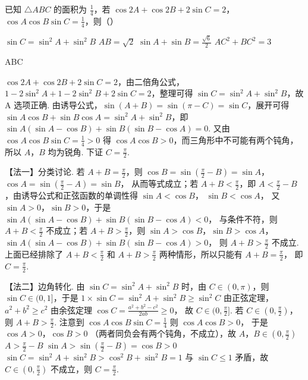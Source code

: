 \documentclass[UTF8,a4paper,oneside,11pt]{ctexbook}
\begin{document}
\begin{problem}
已知 \(\triangle ABC\) 的面积为 \(\frac{1}{4}\)，若 \(\cos 2A + \cos 2B + 2\sin C = 2\)，\(\cos A \cos B \sin C = \frac{1}{4}\)，则（\quad）

\choices
    {\(\sin C = \sin^2 A + \sin^2 B\)}
    {\(AB = \sqrt{2}\)}
    {\(\sin A + \sin B = \frac{\sqrt{6}}{2}\)}
    {\(AC^2 + BC^2 = 3\)}
\end{problem}

\begin{answer}
ABC
\end{answer}

\begin{solution}
\(\cos 2A + \cos 2B + 2\sin C = 2\)，由二倍角公式，\(1 - 2\sin^2 A + 1 - 2\sin^2 B + 2\sin C = 2\)，整理可得 \(\sin C = \sin^2 A + \sin^2 B\)，故 A 选项正确. 由诱导公式，\(\sin (A + B) = \sin (\pi - C) = \sin C\)，展开可得 \(\sin A \cos B + \sin B \cos A = \sin^2 A + \sin^2 B\)，即 \(\sin A (\sin A - \cos B) + \sin B (\sin B - \cos A) = 0\). 又由 \(\cos A\cos B\sin C=\frac{1}{4}>0\) 得 \(\cos A\cos B>0\)，而三角形中不可能有两个钝角，所以 \(A\)，\(B\) 均为锐角. 下证 \(C = \frac{\pi}{2}\).

【法一】分类讨论. 若 \(A + B = \frac{\pi}{2}\)，则
\(\cos B=\sin\left(\frac{\pi}{2}-B\right)=\sin A\)，\(\cos A=\sin\left(\frac{\pi}{2}-A\right)=\sin B\)，
从而等式成立；若 \(A + B < \frac{\pi}{2}\)，即 \(A < \frac{\pi}{2} - B\)，由诱导公式和正弦函数的单调性得
\(\sin A < \cos B\)，
\(\sin B < \cos A\)，
又 \(\sin A > 0\)，\(\sin B > 0\)，于是
\(\sin A (\sin A - \cos B) + \sin B (\sin B - \cos A) < 0\)，
与条件不符，则 \(A + B < \frac{\pi}{2}\) 不成立；若 \(A + B > \frac{\pi}{2}\)，则
\(\sin A > \cos B\)，\(\sin B > \cos A\)，
\(\sin A (\sin A - \cos B) + \sin B (\sin B - \cos A) > 0\)，
则 \(A + B > \frac{\pi}{2}\) 不成立.
上面已经排除了 \(A+B<\frac{\pi}{2}\) 和 \(A+B>\frac{\pi}{2}\) 两种情形，所以只能有
\(A + B = \frac{\pi}{2}\)，
即 \(C = \frac{\pi}{2}\).

【法二】边角转化. 由 \(\sin C = \sin^2 A + \sin^2 B\) 时，由 \(C \in (0,\pi)\)，则 \(\sin C \in (0,1]\)，于是
\(1 \times \sin C = \sin^2 A + \sin^2 B \ge \sin^2 C\)
由正弦定理，
\(a^2 + b^2 \ge c^2\)
由余弦定理
\(\cos C=\frac{a^2+b^2-c^2}{2ab}\ge 0\)，
故 \(C \in (0,\frac{\pi}{2}]\). 若 \(C \in (0,\frac{\pi}{2})\)，则 \(A + B > \frac{\pi}{2}\).
注意到
\(\cos A \cos B \sin C = \frac{1}{4}\)
则
\(\cos A \cos B > 0\)，
于是
\(\cos A > 0\)，\(\cos B > 0\)
（两者同负会有两个钝角，不成立），故
\(A\)，\(B \in (0, \frac{\pi}{2})\)
\(A > \frac{\pi}{2} - B\)
\(
\sin A > \sin \left(\frac{\pi}{2} - B\right) = \cos B > 0
\)
\(
\sin C=\sin^2 A+\sin^2 B>\cos^2 B+\sin^2 B=1
\)
与 \(\sin C \le 1\) 矛盾，故 \(C \in (0,\frac{\pi}{2})\) 不成立，则 \(C = \frac{\pi}{2}\).


\end{solution}
\end{document}
